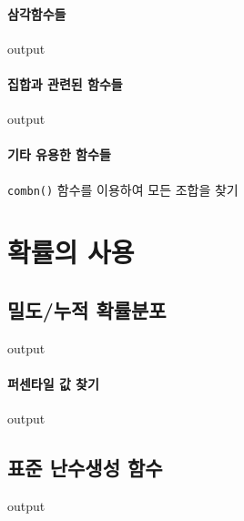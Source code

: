 \documentclass{report}
\begin{document}
\paragraph{삼각함수들}
\begin{Schunk}
\begin{Soutput}
output
\end{Soutput}
\end{Schunk}
\paragraph{집합과 관련된 함수들}
\begin{Schunk}
\begin{Soutput}
output
\end{Soutput}
\end{Schunk}
\paragraph{기타 유용한 함수들}
\texttt{combn()} 함수를 이용하여 모든 조합을 찾기

\section{확률의 사용}

\subsection{밀도/누적 확률분포}
\begin{Schunk}
\begin{Soutput}
output
\end{Soutput}
\end{Schunk}

\paragraph{퍼센타일 값 찾기}
\begin{Schunk}
\begin{Soutput}
output
\end{Soutput}
\end{Schunk}

\subsection{표준 난수생성 함수}
\begin{Schunk}
\begin{Soutput}
output
\end{Soutput}
\end{Schunk}
\end{document}
